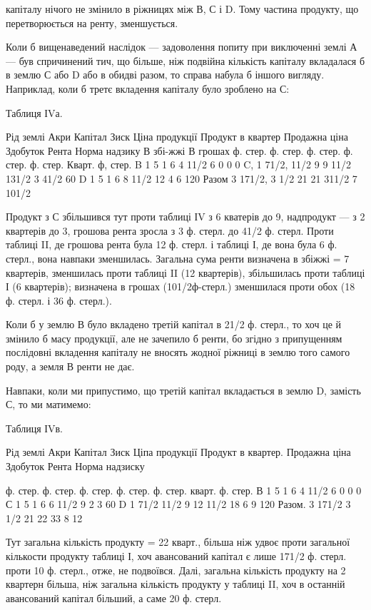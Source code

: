 капіталу нічого не змінило в ріжницях між В, С і D. Тому частина продукту,
що перетворюється на ренту, зменшується.

Коли б вищенаведений наслідок — задоволення попиту при виключенні
землі А — був спричинений тич, що більше, ніж подвійна кількість капіталу
вкладалася б в землю С або D або в обидві разом, то справа набула б іншого
вигляду. Наприклад, коли б третє вкладення капіталу було зроблено на С:

Таблиця ІVа.

Рід землі    Акри    Капітал    Зиск    Ціна  продукції    Продукт в квартер    Продажна  ціна   
Здобуток    Рента        Норма  надзику
                                В збі-жжі    В  грошах
        ф. стер. ф. стер. ф. стер. ф. стер. ф. стер. Кварт. ф, стер.
B          1    5          1          6    4    11/2      6    0    0    0
C,          1    71/2,    11/2          9    9    11/2          131/2    3    41/2    60%
D          1    5          1          6    8    11/2         12    4    6    120%
Разом  3    171/2,    3 1/2    21    21             311/2    7    101/2

Продукт з С збільшився тут проти таблиці ІV з 6 кватерів до 9, надпродукт
— з 2 квартерів до 3, грошова рента зросла з 3 ф. стерл. до 41/2 ф.
стерл. Проти таблиці II, де грошова рента була 12 ф. стерл. і таблиці І,
де вона була 6 ф. стерл., вона навпаки зменшилась. Загальна сума ренти визначена
в збіжжі = 7 квартерів, зменшилась проти таблиці II (12 квартерів),
збільшилась проти таблиці І (6 квартерів); визначена в грошах (101/2ф-стерл.)
зменшилася проти обох (18 ф. стерл. і 36 ф. стерл.).

Коли б у землю В було вкладено третій капітал в 21/2 ф. стерл., то хоч
це й змінило б масу продукції, але не зачепило б ренти, бо згідно з припущенням
послідовні вкладення капіталу не вносять жодної ріжниці в землю того
самого роду, а земля В ренти не дає.

Навпаки, коли ми припустимо, що третій капітал вкладається в землю D,
замість С, то ми матимемо:

Таблиця ІVв.

Рід землі    Акри    Капітал    Зиск    Ціпа  продукції    Продукт в квартер. Продажна ціна    
Здобуток    Рента        Норма надзиску

ф. стер. ф. стер. ф. стер. ф. стер. ф. стер. кварт. ф. стер.
В            1    5            1            6    4    11/2     6    0    0    0
С            1    5            1            6    6    11/2     9    2    3    60%
D             1    71/2    11/2    9    12    11/2      18    6    9    120%
Разом.    3    171/2    3 1/2    21    22                33    8    12

Тут загальна кількість продукту = 22 кварт., більша ніж удвоє проти
загальної кількости продукту таблиці І, хоч авансований капітал є лише 171/2
ф. стерл. проти 10 ф. стерл., отже, не подвоївся. Далі, загальна кількість продукту
на 2 квартерн більша, ніж загальна кількість продукту у таблиці II, хоч
в останній авансований капітал більший, а саме 20 ф. стерл.
